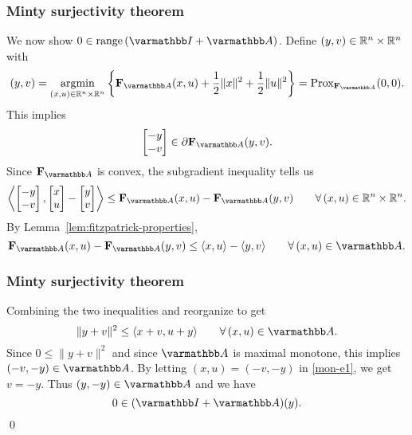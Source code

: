 \documentclass[10pt,mathserif]{beamer}
\begin{document}
\begin{frame}
\frametitle{Minty surjectivity theorem}
We now show $0\in \range(\opI+\opA)$.
Define $(y,v)\in \mathbb{R}^n\times\mathbb{R}^n$ with
\begin{equation*}
(y,v)=\argmin_{(x,u)\in\reals^n\times\reals^n}\left\{\fitzpatrick_\opA(x,u)+\frac{1}{2}\|x\|^2+\frac{1}{2}\|u\|^2\right\}=\prox_{\fitzpatrick_\opA}(0,0).
\label{mon-e0}
\end{equation*}
This implies 
\[
\begin{bmatrix}
-y\\-v
\end{bmatrix}\in \partial \fitzpatrick_\opA(y,v).
\]
Since $\fitzpatrick_\opA$ is convex, the subgradient inequality tells us
\[
\left<
\begin{bmatrix}
-y\\-v
\end{bmatrix},
\begin{bmatrix}
x\\u
\end{bmatrix}
-
\begin{bmatrix}
y\\v
\end{bmatrix}\right>\le \fitzpatrick_\opA(x,u)-\fitzpatrick_\opA(y,v)
\qquad
\forall\,(x,u)\in \reals^n\times\reals^n.
\]
By Lemma~\ref{lem:fitzpatrick-properties},
\[
\fitzpatrick_\opA(x,u)-\fitzpatrick_\opA(y,v)\le \langle x,u\rangle-\langle y,v\rangle
\qquad
\forall\,(x,u)\in \opA.
\]
\end{frame}

\begin{frame}
\frametitle{Minty surjectivity theorem}
Combining the two inequalities and reorganize to get
\begin{equation}
\|y+v\|^2\le \langle x+v,u+y\rangle\qquad\forall\, (x,u)\in \opA.
\label{mon-e1}
\end{equation}
Since $0\le \|y+v\|^2$ and since $\opA$ is maximal monotone, this implies $(-v,-y)\in \opA$.
By letting $(x,u)=(-v,-y)$ in \eqref{mon-e1}, we get $v=-y$.
Thus $(y,-y)\in \opA$ and we have
\[
0\in (\opI+\opA)(y).
\]
\qed
\end{frame}
\end{document}
